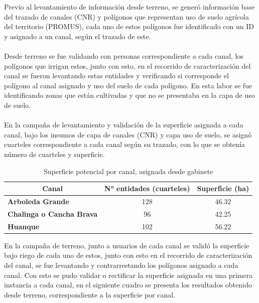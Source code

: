 \documentclass[]{article}
\begin{document}
Previo al levantamiento de información desde terreno, se generó información base del trazado de canales (CNR) y polígonos que representan uso de suelo agrícola del territorio (PROMUS), cada uno de estos polígonos fue identificado  con un ID y asignado a un canal, según el trazado de este.\\
\\
Desde terreno se fue validando con personas correspondiente a cada canal, los polígonos que irrigan estos, junto con esto, en el recorrido de caracterización del canal se fueron levantando estas entidades y verificando si corresponde el polígono al canal asignado y uso del suelo de cada polígono. En esta labor se fue identificando zonas que están cultivadas y que no se presentaba en la capa de uso de suelo.\\
\\
En la campaña de levantamiento y validación de la superficie asignada a cada canal, bajo los insumos de capa de canales (CNR) y capa uso de suelo, se asignó cuarteles correspondiente a cada canal según su trazado, con lo que se obtenía número de cuarteles y superficie.

\begin{table}[H]
\centering
\caption{Superficie potencial por canal, asignada desde gabinete}
\label{my-label}
\begin{tabular}{|l|c|c|}
\hline
\multicolumn{1}{|c|}{\textbf{Canal}} & \textbf{N° entidades (cuarteles)} & \textbf{Superficie (ha)} \\ \hline
\textbf{Arboleda Grande}             & 128                               & 46.32                    \\ \hline
\textbf{Chalinga o Cancha Brava}     & 96                                & 42.25                    \\ \hline
\textbf{Huanque}                     & 102                               & 56.22                    \\ \hline
\end{tabular}
\end{table}

En la campaña de terreno, junto a usuarios de cada canal se validó la superficie bajo riego de cada uno de estos, junto con esto en el recorrido de caracterización del canal, se fue levantando y contrarrestando los polígonos asignado a cada canal. Con esto se pudo validar o rectificar la superficie asignada en una primera instancia a cada canal, en el siguiente cuadro se presenta los resultados obtenido desde terreno, correspondiente a la superficie por canal.
\end{document}
